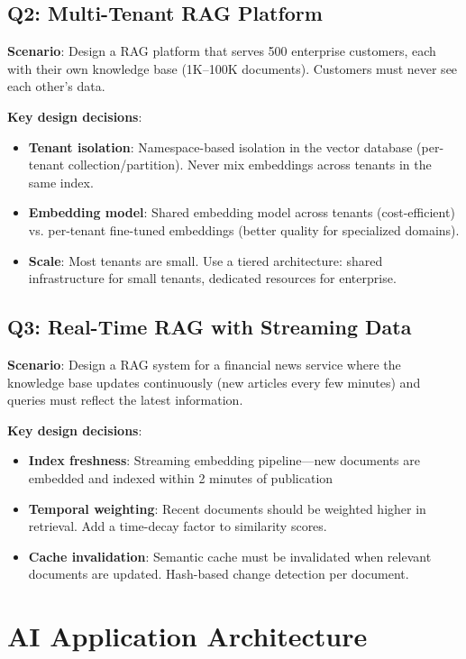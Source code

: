 \subsection{Q2: Multi-Tenant RAG Platform}

\textbf{Scenario}: Design a RAG platform that serves 500 enterprise customers, each with their own knowledge base (1K--100K documents). Customers must never see each other's data.

\textbf{Key design decisions}:
\begin{itemize}[leftmargin=*]
    \item \textbf{Tenant isolation}: Namespace-based isolation in the vector database (per-tenant collection/partition). Never mix embeddings across tenants in the same index.
    \item \textbf{Embedding model}: Shared embedding model across tenants (cost-efficient) vs. per-tenant fine-tuned embeddings (better quality for specialized domains).
    \item \textbf{Scale}: Most tenants are small. Use a tiered architecture: shared infrastructure for small tenants, dedicated resources for enterprise.
\end{itemize}

\subsection{Q3: Real-Time RAG with Streaming Data}

\textbf{Scenario}: Design a RAG system for a financial news service where the knowledge base updates continuously (new articles every few minutes) and queries must reflect the latest information.

\textbf{Key design decisions}:
\begin{itemize}[leftmargin=*]
    \item \textbf{Index freshness}: Streaming embedding pipeline---new documents are embedded and indexed within 2 minutes of publication
    \item \textbf{Temporal weighting}: Recent documents should be weighted higher in retrieval. Add a time-decay factor to similarity scores.
    \item \textbf{Cache invalidation}: Semantic cache must be invalidated when relevant documents are updated. Hash-based change detection per document.
\end{itemize}


\section{AI Application Architecture}

